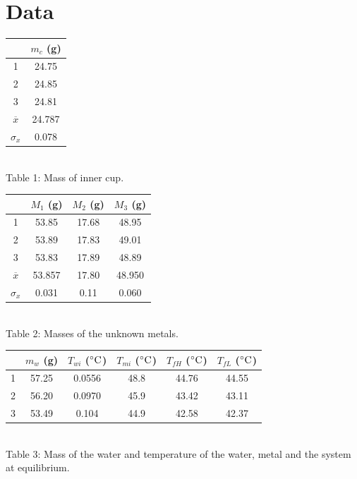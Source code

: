 \documentclass[12pt]{article}
\begin{document}
    \section{Data}
        \begin{center}
            \begin{tabular}{c|c}
                 & \(m_c\) (g) \\
                \hline
                1 & 24.75 \\
                2 & 24.85 \\
                3 & 24.81 \\
                \hline
                \(\overline{x}\) & 24.787 \\
                \(\sigma_x\) & 0.078 
            \end{tabular}\\[6pt]
                Table 1: Mass of inner cup.\\[12pt]
            \begin{tabular}{c|c|c|c}
                 &\(M_1\) (g) & \(M_2\) (g) & \(M_3\) (g)\\
                \hline
                1 & 53.85 & 17.68 & 48.95\\
                2 & 53.89 & 17.83 & 49.01\\
                3 & 53.83 & 17.89 & 48.89\\
                \hline
                \(\overline{x}\) & 53.857 & 17.80 & 48.950\\
                \(\sigma_x\) & 0.031 & 0.11 & 0.060
            \end{tabular}\\[6pt]
            Table 2: Masses of the unknown metals.\\[12pt]

            \begin{tabular}{c|c|c|c|c|c}
                & \(m_w\) (g) &\(T_{wi}\) (\(\mathrm{\degree C}\)) & \(T_{mi}\) (\(\mathrm{\degree C}\)) & \(T_{fH}\)  (\(\mathrm{\degree C}\)) & \(T_{fL}\) (\(\mathrm{\degree C}\))\\
                \hline
                1 & 57.25 & 0.0556 & 48.8 & 44.76 & 44.55\\
                2 & 56.20 & 0.0970 & 45.9 & 43.42 & 43.11\\
                3 & 53.49 & 0.104 & 44.9 & 42.58 & 42.37\\
            \end{tabular}\\[6pt]
            Table 3: Mass of the water and temperature of the water, metal and the system at equilibrium.
        \end{center}
\end{document}
